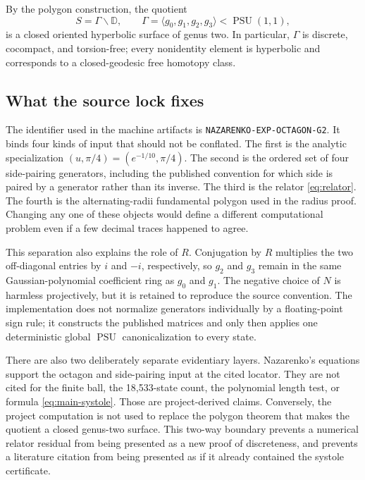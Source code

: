 \documentclass[11pt,a4paper]{article}
\theoremstyle{definition}
\newcommand{\D}{\mathbb D}
\newcommand{\PSU}{\operatorname{PSU}}
\begin{document}
By the polygon construction, the quotient
\[
 S=\Gamma\backslash\D,
 \qquad \Gamma=\langle g_0,g_1,g_2,g_3\rangle<\PSU(1,1),
\]
is a closed oriented hyperbolic surface of genus two.  In particular,
\(\Gamma\) is discrete, cocompact, and torsion-free; every nonidentity element
is hyperbolic and corresponds to a closed-geodesic free homotopy class.

\subsection{What the source lock fixes}

The identifier used in the machine artifacts is
\texttt{NAZARENKO-EXP-OCTAGON-G2}.  It binds four kinds of input that should
not be conflated.  The first is the analytic specialization
\((u,\pi/4)=(e^{-1/10},\pi/4)\).  The second is the ordered set of four
side-pairing generators, including the published convention for which side is
paired by a generator rather than its inverse.  The third is the relator
\eqref{eq:relator}.  The fourth is the alternating-radii fundamental polygon
used in the radius proof.  Changing any one of these objects would define a
different computational problem even if a few decimal traces happened to
agree.

This separation also explains the role of \(R\).  Conjugation by \(R\)
multiplies the two off-diagonal entries by \(i\) and \(-i\), respectively, so
\(g_2\) and \(g_3\) remain in the same Gaussian-polynomial coefficient ring as
\(g_0\) and \(g_1\).  The negative choice of \(N\) is harmless projectively,
but it is retained to reproduce the source convention.  The implementation
does not normalize generators individually by a floating-point sign rule; it
constructs the published matrices and only then applies one deterministic
global \(\PSU\) canonicalization to every state.

There are also two deliberately separate evidentiary layers.  Nazarenko's
equations support the octagon and side-pairing input at the cited locator.
They are not cited for the finite ball, the 18,533-state count, the polynomial
length test, or formula \eqref{eq:main-systole}.  Those are project-derived
claims.  Conversely, the project computation is not used to replace the
polygon theorem that makes the quotient a closed genus-two surface.  This
two-way boundary prevents a numerical relator residual from being presented
as a new proof of discreteness, and prevents a literature citation from being
presented as if it already contained the systole certificate.
\end{document}
